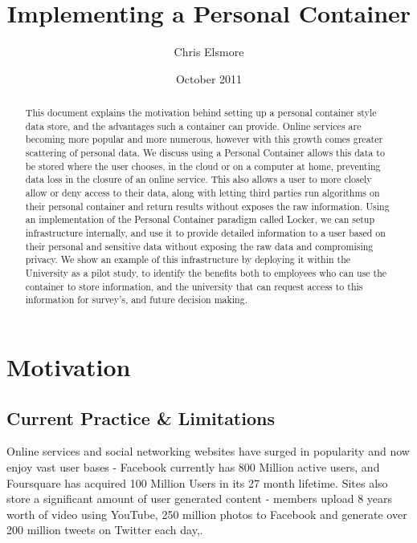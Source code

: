 \documentclass[11pt,a4paper,twoside]{article}
\begin{document}
\setcounter{page}{1}

\title{Implementing a Personal Container}
\author{Chris Elsmore}
\date{October 2011}

\maketitle %

\begin{abstract}
This document explains the motivation behind setting up a personal container style data store, and the advantages such a container can provide. Online services are becoming more popular and more numerous, however with this growth comes greater scattering of personal data. We discuss using a Personal Container allows this data to be stored where the user chooses, in the cloud or on a computer at home, preventing data loss in the closure of an online service. This also allows a user to more closely allow or deny access to their data, along with letting third parties run algorithms on their personal container and return results without exposes the raw information. Using an implementation of the Personal Container paradigm called Locker, we can setup infrastructure internally, and use it to provide detailed information to a user based on their personal and sensitive data without exposing the raw data and compromising privacy. We show an example of this infrastructure by deploying it within the University as a pilot study, to identify the benefits both to employees who can use the container to store information, and the university that can request access to this information for survey's, and future decision making.
\end{abstract}

\newpage

\section{Motivation}

\subsection{Current Practice \& Limitations}
Online services and social networking websites have surged in popularity and now enjoy vast user bases - Facebook currently has 800 Million active users\cite{facebook:qr}, and Foursquare has acquired 100 Million Users in its 27 month lifetime\cite{foursquare:sd}. Sites also store a significant amount of user generated content - members upload 8 years worth of video using YouTube, 250 million photos to Facebook and generate over 200 million tweets on Twitter each day\cite{youtube:sa},\cite{twiter:st}.
\end{document}
